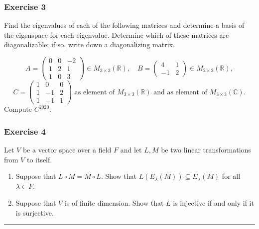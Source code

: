 \documentclass[
  12pt,
  a4paper,
  twoside]{article}
\theoremstyle{plain}
\theoremstyle{definition}
\begin{document}
\hypertarget{exercise-3-8}{%
\subsubsection*{Exercise 3}\label{exercise-3-8}}

Find the eigenvalues of each of the following matrices and
determine a basis of the eigenspace for each eigenvalue. Determine
which of these matrices are diagonalizable; if so, write down a
diagonalizing matrix.

\[A= \left(\begin{array}{ccc} 0 & 0 & -2\\ 1&2&1\\1&0&3
\end{array}\right) \in M_{3 \times 3}(\mathbb{R}), \quad B=
\left(\begin{array}{cc}4&1\\-1&2\end{array}\right) \in M_{2 \times
2}(\mathbb{R}),\]
\[C=\left(\begin{array}{ccc}1&0&0\\1&-1&2\\1&-1&1\end{array}\right)
\textrm{ as element of } M_{3 \times 3}(\mathbb{R}) \textrm{ and as
element of } M_{3 \times 3}(\mathbb{C}).\] Compute \(C^{2020}\).

\hypertarget{exercise-4-6}{%
\subsubsection*{Exercise 4}\label{exercise-4-6}}

Let \(V\) be a vector space over a field \(F\) and let \(L, M\) be two
linear transformations from \(V\) to itself.

\begin{enumerate}
\def\labelenumi{(\alph{enumi})}
\item
  Suppose that \(L \circ M = M \circ L\). Show that
  \(L(E_\lambda(M)) \subseteq E_\lambda(M)\) for all \(\lambda \in F\).
\item
  Suppose that \(V\) is of finite dimension. Show that \(L\) is
  injective if and only if it is surjective.
\end{enumerate}

\begin{center}\rule{0.5\linewidth}{0.5pt}\end{center}
\end{document}
